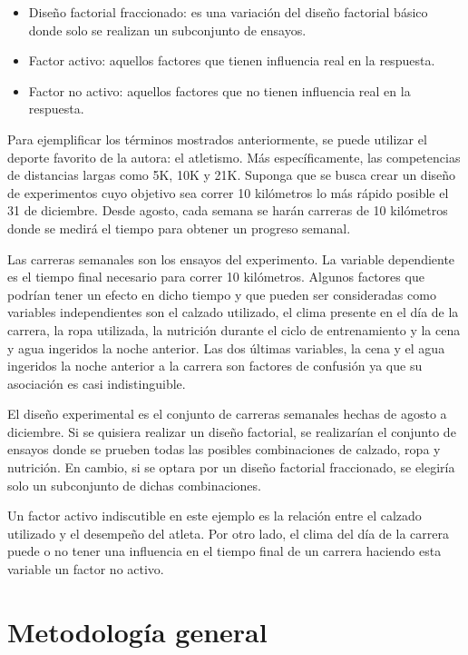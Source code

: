 \begin{itemize}
	\item Diseño factorial fraccionado: es una variación del diseño factorial básico donde solo se realizan un subconjunto de ensayos. 
	
	\item Factor activo: aquellos factores que tienen influencia real en la respuesta.
	
	\item Factor no activo: aquellos factores que no tienen influencia real en la respuesta. 
	
\end{itemize}

Para ejemplificar los términos mostrados anteriormente, se puede utilizar el  deporte favorito de la autora: el atletismo. Más específicamente, las competencias de distancias largas como 5K, 10K y 21K. Suponga que se busca crear un diseño de experimentos cuyo objetivo sea correr 10 kilómetros lo más rápido posible el 31 de diciembre. Desde agosto, cada semana se harán carreras de 10 kilómetros donde se medirá el tiempo para obtener un progreso semanal.

Las carreras semanales son los ensayos del experimento. La variable dependiente es el tiempo final necesario para correr 10 kilómetros. Algunos factores que podrían tener un efecto en dicho tiempo y que pueden ser consideradas como variables independientes son el calzado utilizado, el clima presente en el día de la carrera, la ropa utilizada, la nutrición durante el ciclo de entrenamiento y la cena y agua ingeridos la noche anterior. Las dos últimas variables, la cena y el agua ingeridos la noche anterior a la carrera son factores de confusión ya que su asociación es casi indistinguible. 

El diseño experimental es el conjunto de carreras semanales hechas de agosto a diciembre. Si se quisiera realizar un diseño factorial, se realizarían el conjunto de ensayos donde se prueben todas las posibles combinaciones de calzado, ropa y nutrición. En cambio, si se optara por un diseño factorial fraccionado, se elegiría solo un subconjunto de dichas combinaciones. 

Un factor activo indiscutible en este ejemplo es la relación entre el calzado utilizado y el desempeño del atleta. Por otro lado, el clima del día de la carrera puede o no tener una influencia en el tiempo final de un carrera haciendo esta variable un factor no activo. 


\section{Metodología general} \label{sec_metodologia}

